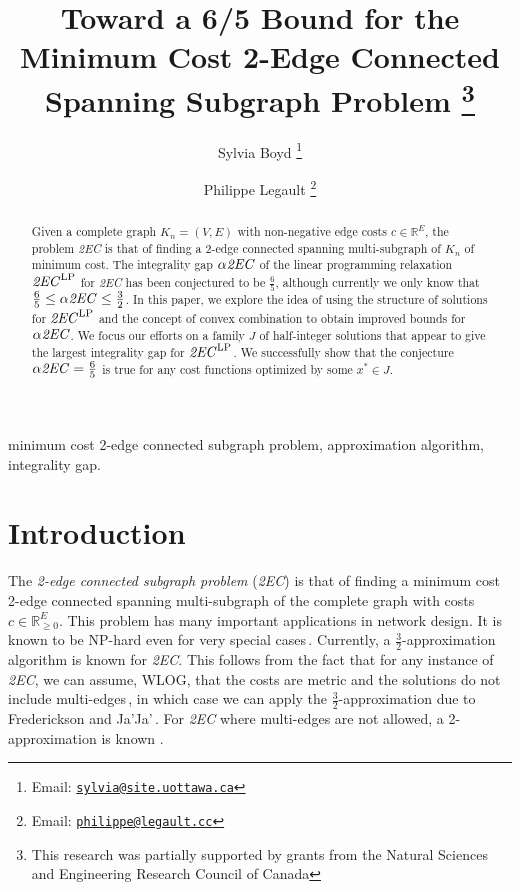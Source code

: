 \documentclass[oneeqnum,final]{siamltex1213}
\title{Toward a 6/5 Bound for the Minimum Cost 2-Edge Connected Spanning Subgraph Problem \thanks{This research was partially supported by grants from the Natural Sciences and \mbox{Engineering} Research Council of Canada}}
\author{Sylvia Boyd \thanks{Email: \href{mailto:sylvia@site.uottawa.ca}   
   {\texttt{sylvia@site.uottawa.ca}}}
\and Philippe Legault \thanks{Email: \href{mailto:philippe@legault.cc}  
   {\texttt{philippe@legault.cc}}}}
\newcommand{\Real}{{\mathbb R}}
\newcommand{\TwoEC}{\emph{2EC}}
\newcommand{\TwoECLP}{\ensuremath{\text{\TwoEC}^{\text{LP}}}}
\newcommand{\alphaTwoEC}{\ensuremath{\alpha\text{\TwoEC}}}
\newcommand{\Kn}{\ensuremath{K_{n}}}
\begin{document}
\maketitle

\begin{abstract}
Given a complete graph $\Kn=(V, E)$ with non-negative edge costs $c\in \Real^{E}$, the problem \TwoEC{} is that of finding a 2-edge connected spanning multi-subgraph of \Kn{} of minimum cost. The integrality gap \alphaTwoEC{} of the linear programming relaxation \TwoECLP{} for \TwoEC{} has been conjectured to be $\frac{6}{5}$, although currently we only know that $\frac{6}{5}\leq\alphaTwoEC\leq\frac{3}{2}$. In this paper, we explore the idea of using the structure of solutions for \TwoECLP{} and the concept of convex combination to obtain improved bounds for \alphaTwoEC. We focus our efforts on a family $J$ of half-integer solutions that appear to give the largest integrality gap for \TwoECLP. We successfully show that the conjecture $\alphaTwoEC = \frac{6}{5}$ is true for any cost functions optimized by some $x^{*}\in J$.
\end{abstract}

\begin{keywords}
minimum cost 2-edge connected subgraph problem, approximation algorithm, integrality gap.
\end{keywords}

\section{Introduction}
The \emph{2-edge connected subgraph problem} (\TwoEC{}) is that of finding a minimum cost 2-edge connected spanning multi-subgraph of the complete graph \sloppy{$\Kn=(V, E)$} with costs $c\in \Real^{E}_{\geq 0}$. This problem has many important applications in network design. It is known to be NP-hard even for very special cases\,\cite{csaba}. Currently, a $\frac{3}{2}$-approximation algorithm is known for \TwoEC{}. This follows from the fact that for any instance of \TwoEC{}, we can assume, WLOG, that the costs are metric and the solutions do not include multi-edges\,\cite{alexander}, in which case we can apply the $\frac{3}{2}$-approximation due to Frederickson and Ja'Ja'\,\cite{frederickson}. For \TwoEC{} where multi-edges are not allowed, a 2-approximation is known \cite{jain}.
\end{document}
